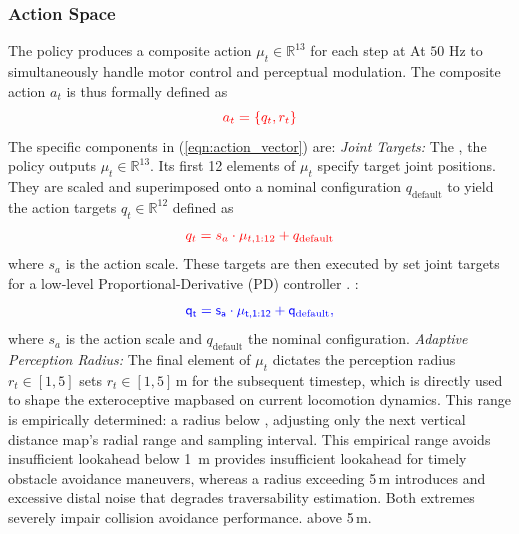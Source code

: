 \documentclass[letterpaper, 10 pt, conference]{ieeeconf/ieeeconf}
\providecommand{\DIFadd}[1]{{\protect\color{blue} \sf #1}} %
\providecommand{\DIFdel}[1]{{\protect\color{red} \scriptsize #1}} %
\providecommand{\DIFaddbegin}{} %
\providecommand{\DIFaddend}{} %
\providecommand{\DIFdelbegin}{} %
\providecommand{\DIFdelend}{} %
\begin{document}
\subsubsection{Action Space}
\DIFdelbegin \DIFdel{The policy produces a composite action $\mu_t \in \mathbb{R}^{13}$ for each step at }\DIFdelend \DIFaddbegin \DIFadd{At }\DIFaddend $50$ Hz\DIFdelbegin \DIFdel{to simultaneously handle motor control and perceptual modulation. The composite action $a_t$ is thus formally defined as
}\begin{displaymath}
    \DIFdel{a_t = \{q_t, r_t\}
    \label{eqn:action_vector}
}\end{displaymath}%
\DIFdel{The specific components in (\ref{eqn:action_vector}) are:
}%
\DIFdel{\textit{Joint Targets:} The }\DIFdelend \DIFaddbegin \DIFadd{, the policy outputs $\mu_t\in\mathbb{R}^{13}$. Its }\DIFaddend first 12 elements \DIFdelbegin \DIFdel{of $\mu_t$ specify target joint positions. They are scaled and superimposed onto a nominal configuration $q_{\text{default}}$ to yield the action targets $q_t \in \mathbb{R}^{12}$ defined as
    }\begin{displaymath}
        \DIFdel{q_t = s_a \cdot \mu_{t, 1:12} + q_{\text{default}}
    }\end{displaymath}%
\DIFdel{where $s_a$ is the action scale. 
    These targets are then executed by }\DIFdelend \DIFaddbegin \DIFadd{set joint targets for }\DIFaddend a low-level Proportional-Derivative (PD) controller\DIFdelbegin \DIFdel{.
    }%
\DIFdelend \DIFaddbegin \DIFadd{:
}\begin{equation}
    \DIFadd{q_t = s_a \cdot \mu_{t,1:12} + q_{\text{default}},
}\end{equation}
\DIFadd{where $s_a$ is the action scale and $q_{\text{default}}$ the nominal configuration. }\DIFaddend \textit{Adaptive Perception Radius:} The final element \DIFdelbegin \DIFdel{of $\mu_t$ dictates the perception radius $r_t \in [1, 5]$}\DIFdelend \DIFaddbegin \DIFadd{sets $r_t\in[1,5]$}\DIFaddend \,m\DIFdelbegin \DIFdel{for the subsequent timestep, which is directly used to shape the exteroceptive mapbased on current locomotion dynamics. This range is empirically determined: a radius below }\DIFdelend \DIFaddbegin \DIFadd{, adjusting only the next vertical distance map's radial range and sampling interval. This empirical range avoids insufficient lookahead below }\DIFaddend 1\,\DIFdelbegin \DIFdel{m provides insufficient lookahead for timely obstacle avoidance maneuvers, whereas a radius exceeding 5\,}\DIFdelend m \DIFdelbegin \DIFdel{introduces }\DIFdelend \DIFaddbegin \DIFadd{and }\DIFaddend excessive distal noise \DIFdelbegin \DIFdel{that degrades traversability estimation. Both extremes severely impair collision avoidance performance.
}%
\DIFdelend \DIFaddbegin \DIFadd{above 5\,m.
}\DIFaddend 
\end{document}
